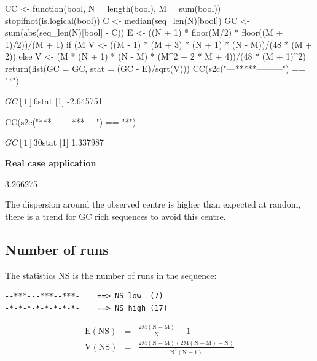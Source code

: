 \documentclass{article}
\begin{document}
\begin{Schunk}
\begin{Sinput}
 CC <- function(bool, N = length(bool), M = sum(bool)) {
     stopifnot(is.logical(bool))
     C <- median(seq_len(N)[bool])
     GC <- sum(abs(seq_len(N)[bool] - C))
     E <- ((N + 1) * floor(M/2) * floor((M + 1)/2))/(M + 1)
     if (M%
         V <- ((M - 1) * (M + 3) * (N + 1) * (N - M))/(48 * 
             (M + 2))
     else V <- (M * (N + 1) * (N - M) * (M^2 + 2 * M + 4))/(48 * 
         (M + 1)^2)
     return(list(GC = GC, stat = (GC - E)/sqrt(V)))
 }
 CC(s2c("---*****---------") == "*")
\end{Sinput}
\begin{Soutput}
$GC
[1] 6

$stat
[1] -2.645751
\end{Soutput}
\begin{Sinput}
 CC(s2c("***-------***----") == "*")
\end{Sinput}
\begin{Soutput}
$GC
[1] 30

$stat
[1] 1.337987
\end{Soutput}
\end{Schunk}

\noindent\textbf{Real case application}

\begin{Schunk}
\begin{Soutput}
[1] 3.266275
\end{Soutput}
\end{Schunk}

The dispersion around the observed centre is higher than expected at random, there is a trend for
GC rich sequences to avoid this centre.



\subsection{Number of runs}

The statistics $$ is the number of runs in the sequence:

\begin{verbatim}
--***---***--***-    ==> NS low  (7)
-*-*-*-*-*-*-*-*-    ==> NS high (17)
\end{verbatim}

\begin{eqnarray*}
\mathrm{E(NS)} & = & \mathrm{\frac{2M(N - M)}{N} + 1} \\
\mathrm{V(NS)} & = & \mathrm{\frac{2M(N - M)(2M(N - M) - N)}{N^2(N - 1)}}
\end{eqnarray*}
\end{document}
